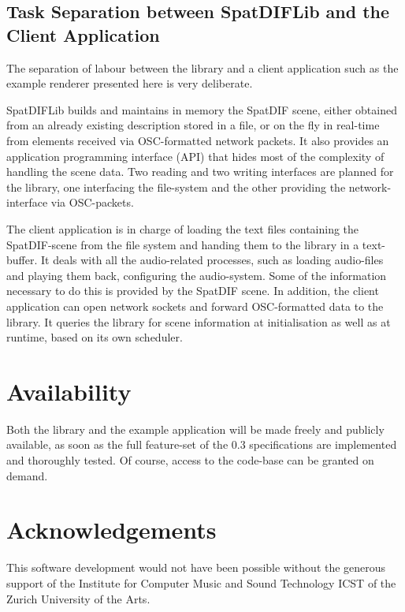 \documentclass[a4paper]{article}
\begin{document}
\subsection{Task Separation between SpatDIFLib and the Client Application}

The separation of labour between the library and a client application such as the example renderer presented here is very deliberate.

SpatDIFLib builds and maintains in memory the SpatDIF scene, either obtained from an already existing description stored in a file, or on the fly in real-time from elements received via OSC-formatted network packets.
It also provides an application programming interface (API) that hides most of the complexity of handling the scene data.
Two reading and two writing interfaces are planned for the library, one interfacing the file-system and the other providing the network-interface via OSC-packets.

The client application is in charge of loading the text files containing the SpatDIF-scene from the file system and handing them to the library in a text-buffer.
It deals with all the audio-related processes, such as loading audio-files and playing them back, configuring the audio-system.
Some of the information necessary to do this is provided by the SpatDIF scene.
In addition, the client application can open network sockets and forward OSC-formatted data to the library.
It queries the library for scene information at initialisation as well as at runtime, based on its own scheduler.

\section{Availability}%

Both the library and the example application will be made freely and publicly available, as soon as the full feature-set of the 0.3 specifications are implemented and thoroughly tested.
Of course, access to the code-base can be granted on demand.

\section{Acknowledgements}%

This software development would not have been possible without the generous support of the Institute for Computer Music and Sound Technology ICST of the Zurich University of the Arts.
\end{document}
